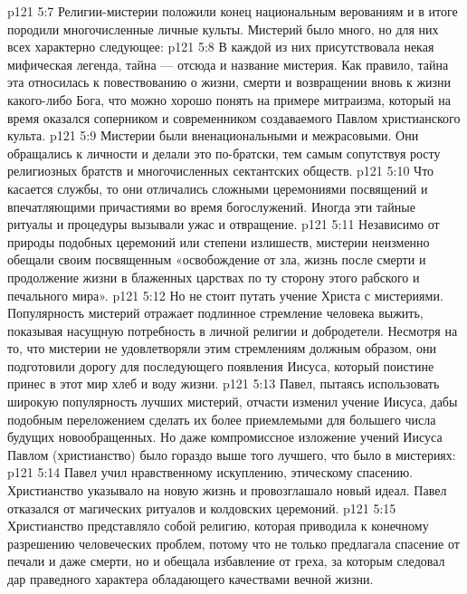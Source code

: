 \vs p121 5:7 \pc Религии\hyp{}мистерии положили конец национальным верованиям и в итоге породили многочисленные личные культы. Мистерий было много, но для них всех характерно следующее:
\vs p121 5:8 \pc {}\bibnobreakspace В каждой из них присутствовала некая мифическая легенда, тайна --- отсюда и название мистерия. Как правило, тайна эта относилась к повествованию о жизни, смерти и возвращении вновь к жизни какого\hyp{}либо Бога, что можно хорошо понять на примере митраизма, который на время оказался соперником и современником создаваемого Павлом христианского культа.
\vs p121 5:9 \pc {}\bibnobreakspace Мистерии были вненациональными и межрасовыми. Они обращались к личности и делали это по\hyp{}братски, тем самым сопутствуя росту религиозных братств и многочисленных сектантских обществ.
\vs p121 5:10 \pc {}\bibnobreakspace Что касается службы, то они отличались сложными церемониями посвящений и впечатляющими причастиями во время богослужений. Иногда эти тайные ритуалы и процедуры вызывали ужас и отвращение.
\vs p121 5:11 \pc {}\bibnobreakspace Независимо от природы подобных церемоний или степени излишеств, мистерии неизменно обещали своим посвященным  «освобождение от зла, жизнь после смерти и продолжение жизни в блаженных царствах по ту сторону этого рабского и печального мира».
\vs p121 5:12 \pc Но не стоит путать учение Христа с мистериями. Популярность мистерий отражает подлинное стремление человека выжить, показывая насущную потребность в личной религии и добродетели. Несмотря на то, что мистерии не удовлетворяли этим стремлениям должным образом, они подготовили дорогу для последующего появления Иисуса, который поистине принес в этот мир хлеб и воду жизни.
\vs p121 5:13 Павел, пытаясь использовать широкую популярность лучших мистерий, отчасти изменил учение Иисуса, дабы подобным переложением сделать их более приемлемыми для большего числа будущих новообращенных. Но даже компромиссное изложение учений Иисуса Павлом (христианство) было гораздо выше того лучшего, что было в мистериях:
\vs p121 5:14 \bibnobreakspace Павел учил нравственному искуплению, этическому спасению. Христианство указывало на новую жизнь и провозглашало новый идеал. Павел отказался от магических ритуалов и колдовских церемоний.
\vs p121 5:15 \pc {}\bibnobreakspace Христианство представляло собой религию, которая приводила к конечному разрешению человеческих проблем, потому что не только предлагала спасение от печали и даже смерти, но и обещала избавление от греха, за которым следовал дар праведного характера обладающего качествами вечной жизни.
